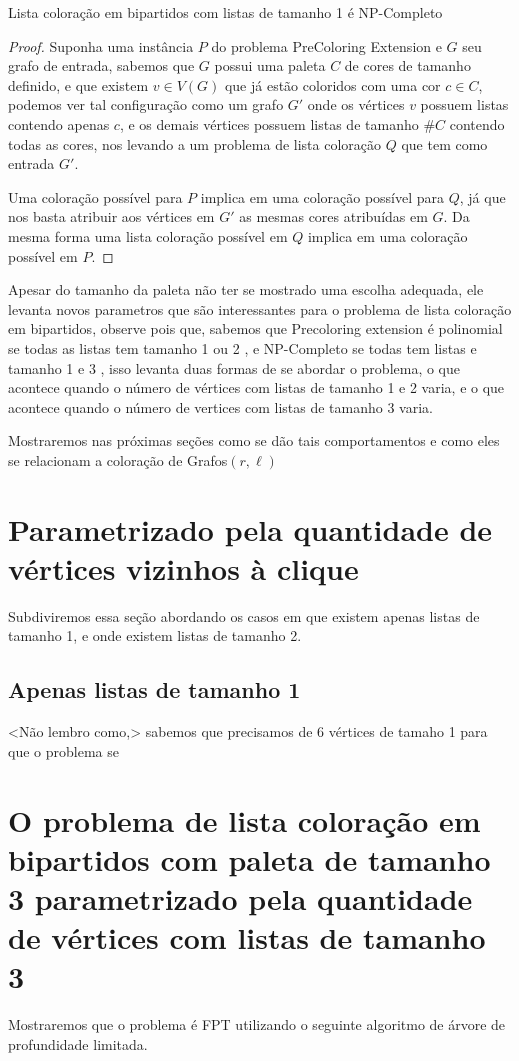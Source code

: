 \begin{teorema}
	Lista coloração em bipartidos com listas de tamanho 1 é NP-Completo
\end{teorema}
\begin{proof}
	Suponha uma instância $P$ do problema PreColoring Extension e $G$ seu grafo de entrada, sabemos que $G$ possui uma paleta $C$ de cores de tamanho definido, e que existem $v \in V(G)$ que já estão coloridos com uma cor $c \in C$, podemos ver tal configuração como um grafo $G'$ onde os vértices $v$ possuem listas contendo apenas $c$, e os demais vértices possuem listas de tamanho $\#C$ contendo todas as cores, nos levando a um problema de lista coloração $Q$ que tem como entrada $G'$.
	
	Uma coloração possível para $P$ implica em uma coloração possível para $Q$, já que nos basta atribuir aos vértices em $G'$ as mesmas cores atribuídas em $G$. Da mesma forma uma lista coloração possível em $Q$ implica em uma coloração possível em $P$.
\end{proof}


Apesar do tamanho da paleta não ter se mostrado uma escolha adequada, ele levanta novos parametros que são interessantes para o problema de lista coloração em bipartidos, observe pois que, sabemos que Precoloring extension é polinomial se todas as listas tem tamanho 1 ou 2 \cite{hujter93}, e NP-Completo se todas tem listas e tamanho 1 e 3 \cite{kratochvil94}, isso levanta duas formas de se abordar o problema, o que acontece quando o número de vértices com listas de tamanho 1 e 2 varia, e o que acontece quando o número de vertices com listas de tamanho 3 varia.

Mostraremos nas próximas seções como se dão tais comportamentos e como eles se relacionam a coloração de Grafos$(r,\ell)$

\section{Parametrizado pela quantidade de vértices vizinhos à clique}
Subdiviremos essa seção abordando os casos em que existem apenas listas de tamanho 1, e onde existem listas de tamanho 2.
\subsection{Apenas listas de tamanho 1}
<Não lembro como,> sabemos que precisamos de 6 vértices de tamaho 1 para que o problema se 
\section{O problema de lista coloração em bipartidos com paleta de tamanho 3 parametrizado pela quantidade de vértices com listas de tamanho 3}
Mostraremos que o problema é FPT utilizando o seguinte algoritmo de árvore de profundidade limitada.
